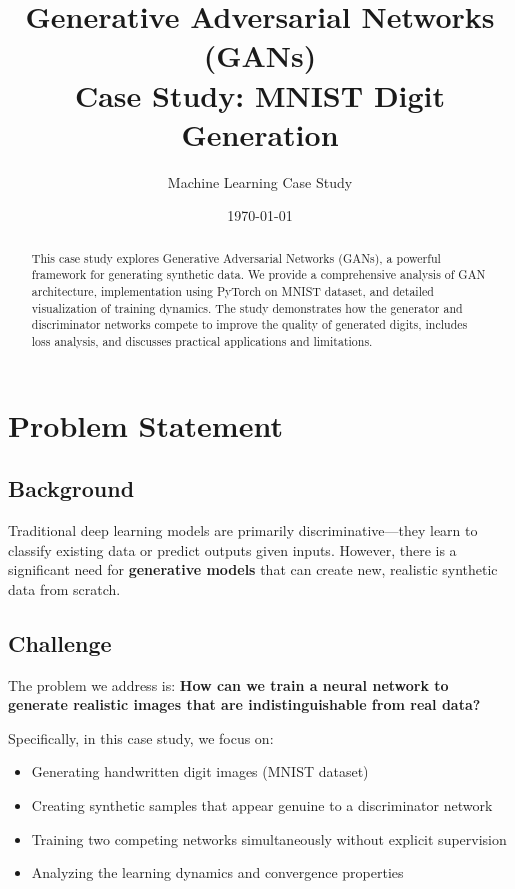 \documentclass[12pt,a4paper]{article}
\title{\textbf{Generative Adversarial Networks (GANs)\\Case Study: MNIST Digit Generation}}
\author{Machine Learning Case Study}
\date{\today}
\begin{document}
\maketitle

\begin{abstract}
This case study explores Generative Adversarial Networks (GANs), a powerful framework for generating synthetic data. We provide a comprehensive analysis of GAN architecture, implementation using PyTorch on MNIST dataset, and detailed visualization of training dynamics. The study demonstrates how the generator and discriminator networks compete to improve the quality of generated digits, includes loss analysis, and discusses practical applications and limitations.
\end{abstract}

\tableofcontents
\newpage

\section{Problem Statement} \label{sec:problem}

\subsection{Background}
Traditional deep learning models are primarily discriminative---they learn to classify existing data or predict outputs given inputs. However, there is a significant need for \textbf{generative models} that can create new, realistic synthetic data from scratch.

\subsection{Challenge}
The problem we address is: \textbf{How can we train a neural network to generate realistic images that are indistinguishable from real data?}

Specifically, in this case study, we focus on:
\begin{itemize}
    \item Generating handwritten digit images (MNIST dataset)
    \item Creating synthetic samples that appear genuine to a discriminator network
    \item Training two competing networks simultaneously without explicit supervision
    \item Analyzing the learning dynamics and convergence properties
\end{itemize}
\end{document}
